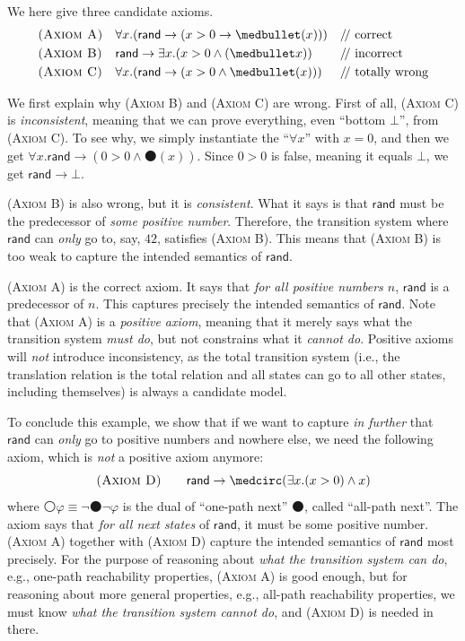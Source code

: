 \documentclass[UTF8,11pt]{article}
\theoremstyle{plain}
\theoremstyle{definition}
\theoremstyle{remark}
\newcommand{\imp}{\to}
\newcommand{\prule}[1]{\textsc{(#1)}}
\newcommand{\wnext}{{\medcirc}}
\newcommand{\snext}{{\medbullet}}
\newcommand{\doubleslash}{/\!/{ }}
\newcommand{\rand}{\mathsf{rand}}
\begin{document}
We here give three candidate axioms.
\begin{align*}
& \prule{Axiom A} &&
\forall x . (\rand \imp (x > 0 \imp \snext(x)))
&& \text{\doubleslash correct} \\
& \prule{Axiom B} &&
\rand \imp \exists x . (x > 0 \wedge (\snext x))
&& \text{\doubleslash incorrect} \\
& \prule{Axiom C} &&
\forall x . (\rand \imp (x > 0 \wedge \snext(x)))
&& \text{\doubleslash totally wrong}
\end{align*}

We first explain why \prule{Axiom B} and \prule{Axiom C} are wrong.
First of all, \prule{Axiom C} is \emph{inconsistent}, meaning that
we can prove everything, even ``bottom $\bot$'', from \prule{Axiom C}.
To see why, we simply instantiate the ``$\forall x$'' with $x = 0$,
and then we get $\forall x . \rand \imp (0 > 0 \wedge \snext(x))$.
Since $0 > 0$ is false, meaning it equals $\bot$,
we get
$\rand \imp \bot$.

\prule{Axiom B} is also wrong, but it is \emph{consistent}.
What it says is that $\rand$ must be the predecessor of \emph{some positive
number}.
Therefore, the transition system where $\rand$ can \emph{only} go to,
say, $42$, satisfies \prule{Axiom B}.
This means that \prule{Axiom B} is too weak to capture the intended semantics
of $\rand$.

\prule{Axiom A} is the correct axiom. It says that \emph{for all positive
numbers
$n$},
$\rand$ is a predecessor of $n$.
This captures precisely the intended semantics of $\rand$.
Note that \prule{Axiom A} is a \emph{positive axiom}, meaning that
it merely says what the transition system \emph{must do},
but not constrains what it \emph{cannot do}.
Positive axioms will \emph{not} introduce inconsistency, as
the total transition system (i.e., the translation relation is the total
relation and all states can go to all other states, including themselves)
is always a candidate model.

To conclude this example, we show that if we want to capture \emph{in further}
that $\rand$ can \emph{only} go to positive numbers and nowhere else,
we need the following axiom, which is \emph{not} a positive axiom anymore:
$$
\prule{Axiom D} \qquad \rand \imp \wnext ( \exists x . (x > 0) \wedge x )
$$
where $\wnext \varphi \equiv \neg \snext \neg \varphi$ is the dual
of ``one-path next'' $\snext$, called ``all-path next''.
The axiom says that \emph{for all next states} of $\rand$,
it must be some positive number.
\prule{Axiom A} together with \prule{Axiom D} capture the intended semantics
of $\rand$ most precisely.
For the purpose of reasoning about \emph{what the transition system can do},
e.g., one-path reachability properties,
\prule{Axiom A} is good enough,
but for reasoning about more general properties, e.g., all-path reachability
properties,
we must know \emph{what the transition system cannot do},
and \prule{Axiom D} is needed in there.
\end{document}
